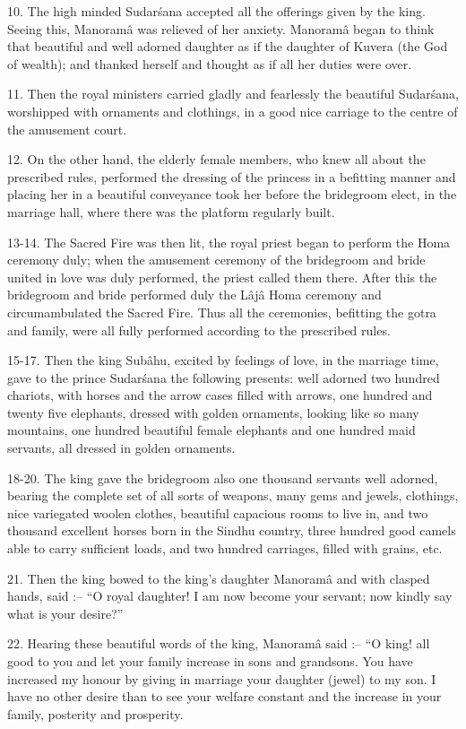 10. The high minded Sudar\'sana accepted all the offerings given by the king. Seeing this, Manoram\^a was relieved of her anxiety. Manoram\^a began to think that beautiful and well adorned daughter as if the daughter of Kuvera (the God of wealth); and thanked herself and thought as if all her duties were over.

11. Then the royal ministers carried gladly and fearlessly the beautiful Sudar\'sana, worshipped with ornaments and clothings, in a good nice carriage to the centre of the amusement court.

12. On the other hand, the elderly female members, who knew all about the prescribed rules, performed the dressing of the princess in a befitting manner and placing her in a beautiful conveyance took her before the bridegroom elect, in the marriage hall, where there was the platform regularly built.

13-14. The Sacred Fire was then lit, the royal priest began to perform the Homa ceremony duly; when the amusement ceremony of the bridegroom and bride united in love was duly performed, the priest called them there. After this the bridegroom and bride performed duly the L\^aj\^a Homa ceremony and circumambulated the Sacred Fire. Thus all the ceremonies, befitting the gotra and family, were all fully performed according to the prescribed rules.

15-17. Then the king Sub\^ahu, excited by feelings of love, in the marriage time, gave to the prince Sudar\'sana the following presents: well adorned two hundred chariots, with horses and the arrow cases filled with arrows, one hundred and twenty five elephants, dressed with golden ornaments, looking like so many mountains, one hundred beautiful female elephants and one hundred maid servants, all dressed in golden ornaments.

18-20. The king gave the bridegroom also one thousand servants well adorned, bearing the complete set of all sorts of weapons, many gems and jewels, clothings, nice variegated woolen clothes, beautiful capacious rooms to live in, and two thousand excellent horses born in the Sindhu country, three hundred good camels able to carry sufficient loads, and two hundred carriages, filled with grains, etc.

21. Then the king bowed to the king's daughter Manoram\^a and with clasped hands, said :-- ``O royal daughter! I am now become your servant; now kindly say what is your desire?''

22. Hearing these beautiful words of the king, Manoram\^a said :-- ``O king! all good to you and let your family increase in sons and grandsons. You have increased my honour by giving in marriage your daughter (jewel) to my son. I have no other desire than to see your welfare constant and the increase in your family, posterity and prosperity.

